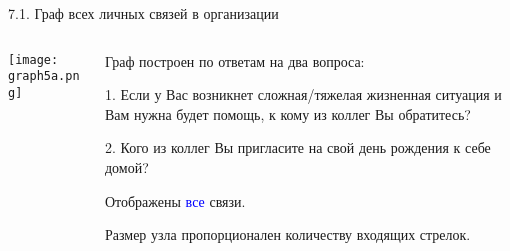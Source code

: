 \begin{frame}{7.1. Граф всех личных связей в организации}

\begin{columns}
\begin{column}{0.75\textwidth} 
\centering
          \texttt{[image: graph5a.png]}
\end{column}
\begin{column}{0.25\textwidth}
\tiny
Граф построен по ответам на два вопроса:
\smallskip

1. Если у Вас возникнет сложная/тяжелая жизненная ситуация и Вам нужна будет помощь, к кому из коллег Вы обратитесь?
\smallskip

2. Кого из коллег Вы пригласите на свой день рождения к себе домой?
\smallskip

Отображены \textcolor{blue}{все} связи. 
\smallskip

Размер узла пропорционален количеству входящих стрелок.

\end{column}
\end{columns}
\end{frame}


